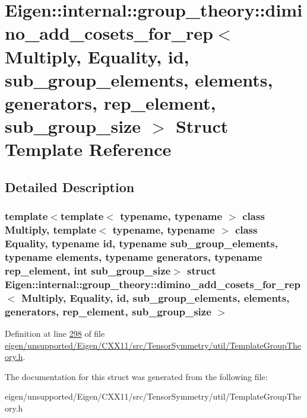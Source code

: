 \hypertarget{struct_eigen_1_1internal_1_1group__theory_1_1dimino__add__cosets__for__rep}{}\section{Eigen\+:\+:internal\+:\+:group\+\_\+theory\+:\+:dimino\+\_\+add\+\_\+cosets\+\_\+for\+\_\+rep$<$ Multiply, Equality, id, sub\+\_\+group\+\_\+elements, elements, generators, rep\+\_\+element, sub\+\_\+group\+\_\+size $>$ Struct Template Reference}
\label{struct_eigen_1_1internal_1_1group__theory_1_1dimino__add__cosets__for__rep}


\subsection{Detailed Description}
\subsubsection*{template$<$template$<$ typename, typename $>$ class Multiply, template$<$ typename, typename $>$ class Equality, typename id, typename sub\+\_\+group\+\_\+elements, typename elements, typename generators, typename rep\+\_\+element, int sub\+\_\+group\+\_\+size$>$\newline
struct Eigen\+::internal\+::group\+\_\+theory\+::dimino\+\_\+add\+\_\+cosets\+\_\+for\+\_\+rep$<$ Multiply, Equality, id, sub\+\_\+group\+\_\+elements, elements, generators, rep\+\_\+element, sub\+\_\+group\+\_\+size $>$}



Definition at line \hyperlink{eigen_2unsupported_2_eigen_2_c_x_x11_2src_2_tensor_symmetry_2util_2_template_group_theory_8h_source_l00298}{298} of file \hyperlink{eigen_2unsupported_2_eigen_2_c_x_x11_2src_2_tensor_symmetry_2util_2_template_group_theory_8h_source}{eigen/unsupported/\+Eigen/\+C\+X\+X11/src/\+Tensor\+Symmetry/util/\+Template\+Group\+Theory.\+h}.



The documentation for this struct was generated from the following file\+:\begin{DoxyCompactItemize}
\item 
eigen/unsupported/\+Eigen/\+C\+X\+X11/src/\+Tensor\+Symmetry/util/\+Template\+Group\+Theory.\+h\end{DoxyCompactItemize}
